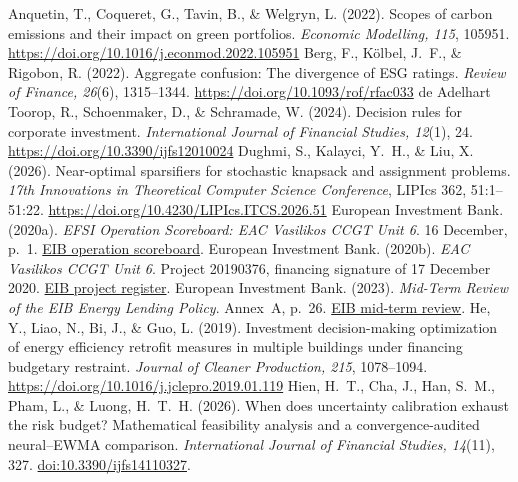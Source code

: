 \begin{thebibliography}{}
\small\setlength{\itemsep}{2pt plus 1pt}
 Anquetin, T., Coqueret, G., Tavin, B., \& Welgryn, L. (2022). Scopes of carbon emissions and their impact on green portfolios. \emph{Economic Modelling, 115}, 105951. \url{https://doi.org/10.1016/j.econmod.2022.105951}
 Berg, F., Kölbel, J.~F., \& Rigobon, R. (2022). Aggregate confusion: The divergence of ESG ratings. \emph{Review of Finance, 26}(6), 1315--1344. \url{https://doi.org/10.1093/rof/rfac033}
 de Adelhart Toorop, R., Schoenmaker, D., \& Schramade, W. (2024). Decision rules for corporate investment. \emph{International Journal of Financial Studies, 12}(1), 24. \url{https://doi.org/10.3390/ijfs12010024}
 Dughmi, S., Kalayci, Y.~H., \& Liu, X. (2026). Near-optimal sparsifiers for stochastic knapsack and assignment problems. \emph{17th Innovations in Theoretical Computer Science Conference}, LIPIcs 362, 51:1--51:22. \url{https://doi.org/10.4230/LIPIcs.ITCS.2026.51}
 European Investment Bank. (2020a). \emph{EFSI Operation Scoreboard: EAC Vasilikos CCGT Unit 6}. 16 December, p.~1. \href{https://www.eib.org/attachments/registers/137305639.pdf}{EIB operation scoreboard}.
 European Investment Bank. (2020b). \emph{EAC Vasilikos CCGT Unit 6}. Project 20190376, financing signature of 17 December 2020. \href{https://www.eib.org/en/projects/all/20190376}{EIB project register}.
 European Investment Bank. (2023). \emph{Mid-Term Review of the EIB Energy Lending Policy}. Annex~A, p.~26. \href{https://www.eib.org/attachments/lucalli/20230012_mid-term_review_of_the_energy_lending_policy_en.pdf}{EIB mid-term review}.
 He, Y., Liao, N., Bi, J., \& Guo, L. (2019). Investment decision-making optimization of energy efficiency retrofit measures in multiple buildings under financing budgetary restraint. \emph{Journal of Cleaner Production, 215}, 1078--1094. \url{https://doi.org/10.1016/j.jclepro.2019.01.119}
 Hien, H.~T., Cha, J., Han, S.~M., Pham, L., \& Luong, H.~T.~H. (2026). When does uncertainty calibration exhaust the risk budget? Mathematical feasibility analysis and a convergence-audited neural--EWMA comparison. \emph{International Journal of Financial Studies, 14}(11), 327. \href{https://www.mdpi.com/2227-7072/14/11/327}{doi:10.3390/ijfs14110327}.

\end{thebibliography}
